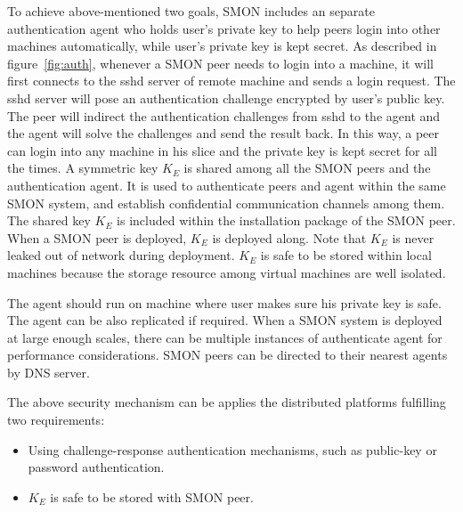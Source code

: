 To achieve above-mentioned two goals, SMON includes an
separate authentication agent who holds user's private key
to help peers login into other machines automatically, while
user's private key is kept secret. As described in
figure~\ref{fig:auth}, whenever a SMON peer needs to login
into a machine, it will first connects to the sshd server of
remote machine and sends a login request. The sshd server
will pose an authentication challenge encrypted by user's
public key. The peer will indirect the authentication
challenges from sshd to the agent and the agent will solve
the challenges and send the result back. In this way, a peer
can login into any machine in his slice and the private key
is kept secret for all the times. A symmetric key
$K_E$ is shared among all the SMON peers and the
authentication agent. It is used to authenticate peers and
agent within the same SMON system, and establish
confidential communication channels among them. The shared
key $K_E$ is included within the installation package of the
SMON peer. When a SMON peer is deployed, $K_E$ is deployed
along. Note that $K_E$ is never leaked out of network during
deployment. $K_E$ is safe to be stored within local machines
because the storage resource among virtual machines are well
isolated.


The agent should run on machine where user makes sure his
private key is safe. The agent can be also replicated if
required. When a SMON system is deployed at large enough
scales, there can be multiple instances of authenticate
agent for performance considerations. SMON peers can be
directed to their nearest agents by DNS server.

The above security mechanism can be applies the distributed
platforms fulfilling two requirements:

\begin{itemize}

  \item Using challenge-response authentication mechanisms,
  such as public-key or password authentication.

  \item $K_E$ is safe to be stored with SMON peer.

\end{itemize}

